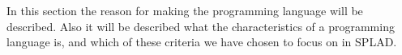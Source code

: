 In this section the reason for making the programming language will be described. Also it will be described what the characteristics of a programming language is, and which of these criteria we have chosen to focus on in SPLAD.